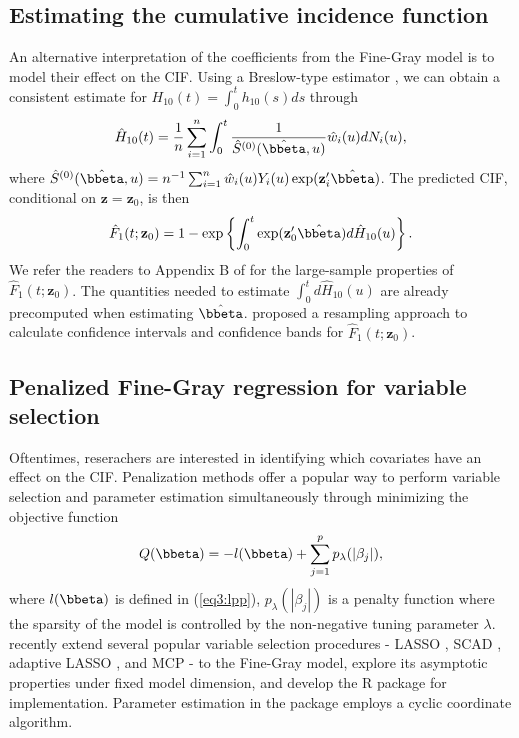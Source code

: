 \subsection{Estimating the cumulative incidence function}
An alternative interpretation of the coefficients from the Fine-Gray model is to model their effect on the CIF. Using a Breslow-type estimator \citep{breslow1974covariance}, we can obtain a consistent estimate for $H_{10}(t) = \int_0^t h_{10}(s)ds$ through
\begin{align*}
\hat{H}_{10}(t) = \frac{1}{n} \sum_{i=1}^n \int_0^t \frac{1}{\hat{S}^{(0)}(\hat{\bbeta}, u)}\hat{w}_i(u)dN_i(u),
\end{align*}
where $\hat{S}^{(0)}(\hat{\bbeta}, u) = n^{-1} \sum_{i=1}^n \hat{w}_i(u)Y_i(u)\exp(\mathbf{z}_i^\prime\hat{\bbeta})$.
The predicted CIF, conditional on $\mathbf{z} = \mathbf{z}_0$, is then
\begin{align*}
\hat{F}_1(t;\mathbf{z}_0) = 1 - \exp\left\{\int_0^t \exp(\mathbf{z}^\prime_0 \hat{\bbeta})d\hat{H}_{10}(u)\right\}.
\end{align*}
We refer the readers to Appendix B of \cite{fine1999proportional} for the large-sample properties of $\hat{F}_1(t; \mathbf{z}_0)$. The quantities needed to estimate $\int_0^t d\hat{H}_{10}(u)$ are already precomputed when estimating $\hat{\bbeta}$. \cite{fine1999proportional} proposed a resampling approach to calculate confidence intervals and confidence bands for $\hat{F}_1(t; \mathbf{z}_0)$.
 

\subsection{Penalized Fine-Gray regression for variable selection}
\label{s3:pen}

Oftentimes, reserachers are interested in identifying which covariates have an effect on the CIF. Penalization methods  \citep{tibshirani1996regression, fan2001variable, zou2006adaptive, zhang2010regularization} offer a popular way to perform variable selection and parameter estimation simultaneously through minimizing the objective function
\begin{align}
Q(\bbeta) = -l(\bbeta) + \sum_{j=1}^p p_\lambda(|\beta_j|),
\end{align}
where $l(\bbeta)$ is defined in (\ref{eq3:lpp}), $p_{\lambda}(|\beta_j|)$ is a penalty function where the sparsity of the model is controlled by the non-negative tuning parameter $\lambda$. \cite{fu2017penalized} recently extend several popular variable selection procedures - LASSO \citep{tibshirani1996regression}, SCAD \citep{fan2001variable}, adaptive LASSO \citep{zou2006adaptive}, and MCP \citep{zhang2010nearly} - to the Fine-Gray model, explore its asymptotic properties under fixed model dimension, and develop the {R} package  \citep{crrp} for implementation. Parameter estimation in the  package employs a cyclic coordinate algorithm.

